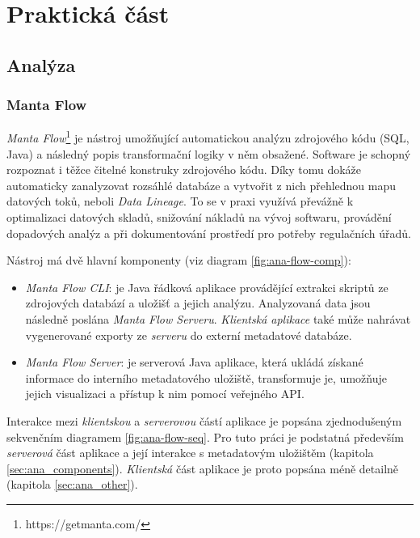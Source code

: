 \chapter{Praktická část}

\section{Analýza}
\subsection{Manta Flow}
\textit{Manta Flow}\footnote{https://getmanta.com/} je nástroj umožňující automatickou analýzu zdrojového kódu (SQL, Java) a následný popis transformační logiky v něm obsažené. Software je schopný rozpoznat i těžce čitelné konstruky zdrojového kódu. Díky tomu dokáže automaticky zanalyzovat rozsáhlé databáze a vytvořit z nich přehlednou mapu datových toků, neboli \textit{Data Lineage}. To se v praxi využívá převážně k optimalizaci datových skladů, snižování nákladů na vývoj softwaru, provádění dopadových analýz a při dokumentování prostředí pro potřeby regulačních úřadů.

Nástroj má dvě hlavní komponenty (viz diagram \ref{fig:ana-flow-comp}):
\begin{itemize}
	\item{\textit{Manta Flow CLI}}: je Java řádková aplikace provádějící extrakci skriptů ze zdrojových databází a uložišť a jejich analýzu. Analyzovaná data jsou následně poslána \textit{Manta Flow Serveru}. \textit{Klientská aplikace} také může nahrávat vygenerované exporty ze \textit{serveru} do externí metadatové databáze.
	\item{\textit{Manta Flow Server}}: je serverová Java aplikace, která ukládá získané informace do interního metadatového uložiště, transformuje je, umožňuje jejich visualizaci a přístup k nim pomocí veřejného API.
\end{itemize}

Interakce mezi \textit{klientskou} a \textit{serverovou} částí aplikace je popsána zjednodušeným sekvenčním diagramem \ref{fig:ana-flow-seq}. Pro tuto práci je podstatná především \textit{serverová} část aplikace a její interakce s metadatovým uložištěm (kapitola \ref{sec:ana_components}). \textit{Klientská} část aplikace je proto popsána méně detailně (kapitola \ref{sec:ana_other}).

